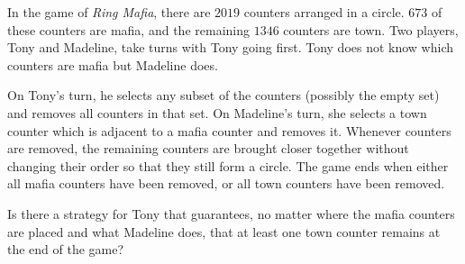 In the game of \textit{Ring Mafia}, there are $2019$ counters arranged in a circle. $673$ of these counters are mafia, and the remaining $1346$ counters are town. Two players, Tony and Madeline, take turns with Tony going first. Tony does not know which counters are mafia but Madeline does.

On Tony’s turn, he selects any subset of the counters (possibly the empty set) and removes all counters in that set. On Madeline’s turn, she selects a town counter which is adjacent to a mafia counter and removes it. Whenever counters are removed, the remaining counters are brought closer together without changing their order so that they still form a circle. The game ends when either all mafia counters have been removed, or all town counters have been removed.

Is there a strategy for Tony that guarantees, no matter where the mafia counters are placed and what Madeline does, that at least one town counter remains at the end of the game?

